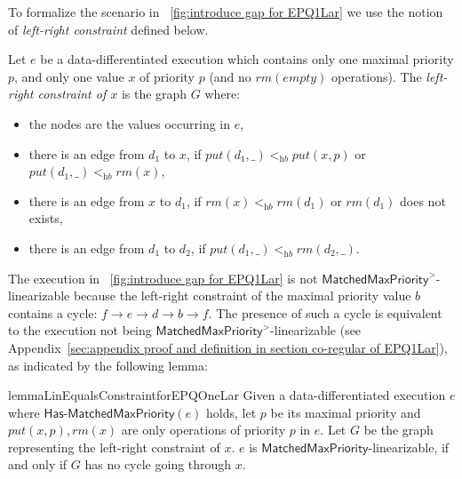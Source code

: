 To formalize the scenario in \figurename~\ref{fig:introduce gap for EPQ1Lar} we use the notion of \emph{left-right constraint} defined below.

\begin{definition}\label{def:left-right constraint for matched put and rm operations}
Let $e$ be a data-differentiated execution which contains only one maximal priority $p$, and only one value $x$ of priority $p$ (and no $\textit{rm}(\textit{empty})$ operations).
The \emph{left-right constraint of $x$} is the graph $G$ where: %
\begin{itemize}
\item the nodes are the values occurring in $e$, %
\item there is an edge from $d_1$ to $x$, if $\textit{put}(d_1,\_) <_{\textit{hb}} \textit{put}(x,p)$ or $\textit{put}(d_1,\_) <_{\textit{hb}} \textit{rm}(x)$,
\item there is an edge from $x$ to $d_1$, if $\textit{rm}(x)<_{\textit{hb}}\textit{rm}(d_1)$ or $\textit{rm}(d_1)$ does not exists,
\item there is an edge from $d_1$ to $d_2$, if $\textit{put}(d_1,\_) <_{\textit{hb}} \textit{rm}(d_2,\_)$.
\end{itemize}
\end{definition}

The execution in \figurename~\ref{fig:introduce gap for EPQ1Lar} is not $\mathsf{MatchedMaxPriority}^>$-linearizable because the left-right constraint of the maximal priority value $b$ contains a cycle: $f \rightarrow e \rightarrow d \rightarrow b \rightarrow f$. The presence of such a cycle is equivalent to the execution not being $\mathsf{MatchedMaxPriority}^>$-linearizable (see Appendix~\ref{sec:appendix proof and definition in section co-regular of EPQ1Lar}), as indicated by the following lemma:

\begin{restatable}{lemma}{LinEqualsConstraintforEPQOneLar}
\label{lemma:Lin Equals Constraint for EPQ1Lar}
Given a data-differentiated execution $e$ where $\mathsf{Has\text{-}MatchedMaxPriority}(e)$ holds, let $p$ be its maximal priority and $\textit{put}(x,p),\textit{rm}(x)$ are only operations of priority $p$ in $e$. Let $G$ be the graph representing the left-right constraint of $x$. $e$ is $\mathsf{MatchedMaxPriority}$-linearizable, if and only if $G$ has no cycle going through $x$.
\end{restatable}


